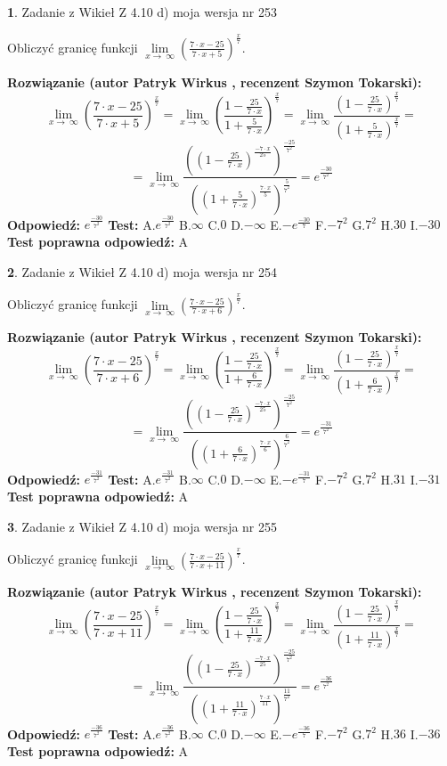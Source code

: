 \documentclass[12pt, a4paper]{article}
\theoremstyle{definition} %
\newtheorem{zad}{}
\newcommand{\zadStart}[1]{\begin{zad}#1\newline}
\newcommand{\zadStop}{\end{zad}}
\newcommand{\rozwStart}[2]{\noindent \textbf{Rozwiązanie (autor #1 , recenzent #2): }\newline}
\newcommand{\rozwStop}{\newline}
\newcommand{\odpStart}{\noindent \textbf{Odpowiedź:}\newline}
\newcommand{\odpStop}{\newline}
\newcommand{\testStart}{\noindent \textbf{Test:}\newline}
\newcommand{\testStop}{\newline}
\newcommand{\kluczStart}{\noindent \textbf{Test poprawna odpowiedź:}\newline}
\newcommand{\kluczStop}{\newline}
\begin{document}
\zadStart{Zadanie z Wikieł Z 4.10 d) moja wersja nr 253}


Obliczyć granicę funkcji  $\lim\limits_{x\to\ \infty}(\frac{7\cdot x-25}{7\cdot x+5})^{\frac{x}{7}}$.
\zadStop
\rozwStart{Patryk Wirkus}{Szymon Tokarski}
$$\lim\limits_{x\to\ \infty}(\frac{7\cdot x-25}{7\cdot x+5})^{\frac{x}{7}} = \lim\limits_{x\to\ \infty}(\frac{1-\frac{25}{7\cdot x}}{1+\frac{5}{7\cdot x}})^{\frac{x}{7}}=\lim\limits_{x\to\ \infty}\frac{(1-\frac{25}{7\cdot x})^{\frac{x}{7}}}{(1+\frac{5}{7\cdot x})^{\frac{x}{7}}}=$$
$$=\lim\limits_{x\to\ \infty}\frac{((1-\frac{25}{7\cdot x})^{\frac{-7\cdot x}{25}})^{\frac{-25}{7^{2}}}}{((1+\frac{5}{7\cdot x})^{\frac{7\cdot x}{5}})^{\frac{5}{7^{2}}}}=e^{\frac{-30}{7^{2}}}$$
\rozwStop
\odpStart
$e^{\frac{-30}{7^{2}}}$
\odpStop
\testStart
A.$e^{\frac{-30}{7^{2}}}$ B.$\infty$ C.$0$ D.$-\infty$ E.$-e^{\frac{-30}{7}}$
F.$-7^{2}$ G.$7^{2}$
H.$30$
I.$-30$
\testStop
\kluczStart
A
\kluczStop



\zadStart{Zadanie z Wikieł Z 4.10 d) moja wersja nr 254}


Obliczyć granicę funkcji  $\lim\limits_{x\to\ \infty}(\frac{7\cdot x-25}{7\cdot x+6})^{\frac{x}{7}}$.
\zadStop
\rozwStart{Patryk Wirkus}{Szymon Tokarski}
$$\lim\limits_{x\to\ \infty}(\frac{7\cdot x-25}{7\cdot x+6})^{\frac{x}{7}} = \lim\limits_{x\to\ \infty}(\frac{1-\frac{25}{7\cdot x}}{1+\frac{6}{7\cdot x}})^{\frac{x}{7}}=\lim\limits_{x\to\ \infty}\frac{(1-\frac{25}{7\cdot x})^{\frac{x}{7}}}{(1+\frac{6}{7\cdot x})^{\frac{x}{7}}}=$$
$$=\lim\limits_{x\to\ \infty}\frac{((1-\frac{25}{7\cdot x})^{\frac{-7\cdot x}{25}})^{\frac{-25}{7^{2}}}}{((1+\frac{6}{7\cdot x})^{\frac{7\cdot x}{6}})^{\frac{6}{7^{2}}}}=e^{\frac{-31}{7^{2}}}$$
\rozwStop
\odpStart
$e^{\frac{-31}{7^{2}}}$
\odpStop
\testStart
A.$e^{\frac{-31}{7^{2}}}$ B.$\infty$ C.$0$ D.$-\infty$ E.$-e^{\frac{-31}{7}}$
F.$-7^{2}$ G.$7^{2}$
H.$31$
I.$-31$
\testStop
\kluczStart
A
\kluczStop



\zadStart{Zadanie z Wikieł Z 4.10 d) moja wersja nr 255}


Obliczyć granicę funkcji  $\lim\limits_{x\to\ \infty}(\frac{7\cdot x-25}{7\cdot x+11})^{\frac{x}{7}}$.
\zadStop
\rozwStart{Patryk Wirkus}{Szymon Tokarski}
$$\lim\limits_{x\to\ \infty}(\frac{7\cdot x-25}{7\cdot x+11})^{\frac{x}{7}} = \lim\limits_{x\to\ \infty}(\frac{1-\frac{25}{7\cdot x}}{1+\frac{11}{7\cdot x}})^{\frac{x}{7}}=\lim\limits_{x\to\ \infty}\frac{(1-\frac{25}{7\cdot x})^{\frac{x}{7}}}{(1+\frac{11}{7\cdot x})^{\frac{x}{7}}}=$$
$$=\lim\limits_{x\to\ \infty}\frac{((1-\frac{25}{7\cdot x})^{\frac{-7\cdot x}{25}})^{\frac{-25}{7^{2}}}}{((1+\frac{11}{7\cdot x})^{\frac{7\cdot x}{11}})^{\frac{11}{7^{2}}}}=e^{\frac{-36}{7^{2}}}$$
\rozwStop
\odpStart
$e^{\frac{-36}{7^{2}}}$
\odpStop
\testStart
A.$e^{\frac{-36}{7^{2}}}$ B.$\infty$ C.$0$ D.$-\infty$ E.$-e^{\frac{-36}{7}}$
F.$-7^{2}$ G.$7^{2}$
H.$36$
I.$-36$
\testStop
\kluczStart
A
\kluczStop
\end{document}
